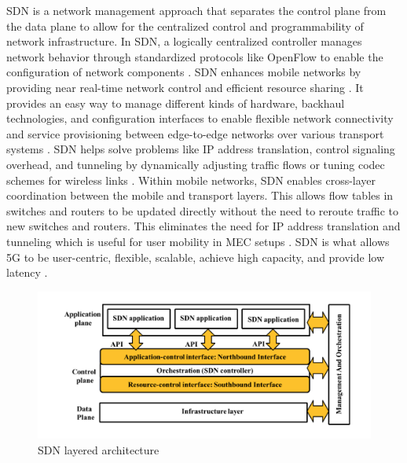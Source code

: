 \documentclass[acmtog]{acmart}
\begin{document}
SDN is a network management approach that separates the control plane from the data plane to allow for the centralized control and programmability of network infrastructure. In SDN, a logically centralized controller manages network behavior through standardized protocols like OpenFlow to enable the configuration of network components \cite{ref3}. SDN enhances mobile networks by providing near real-time network control and efficient resource sharing \cite{ref6_1}. It provides an easy way to manage different kinds of hardware, backhaul technologies, and configuration interfaces to enable flexible network connectivity and service provisioning between edge-to-edge networks over various transport systems \cite{ref6_1}. SDN helps solve problems like IP address translation, control signaling overhead, and tunneling by dynamically adjusting traffic flows or tuning codec schemes for wireless links \cite{ref6_1}. Within mobile networks, SDN enables cross-layer coordination between the mobile and transport layers. This allows flow tables in switches and routers to be updated directly without the need to reroute traffic to new switches and routers. This eliminates the need for IP address translation and tunneling which is useful for user mobility in MEC setups \cite{ref6_1}. SDN is what allows 5G to be user-centric, flexible, scalable, achieve high capacity, and provide low latency \cite{ref6}.
\begin{figure}[h]
  \centering
  \includegraphics[width=\linewidth]{sdn.png}
  \caption{SDN layered architecture \cite{ref7_1}}
\end{figure}
\end{document}

